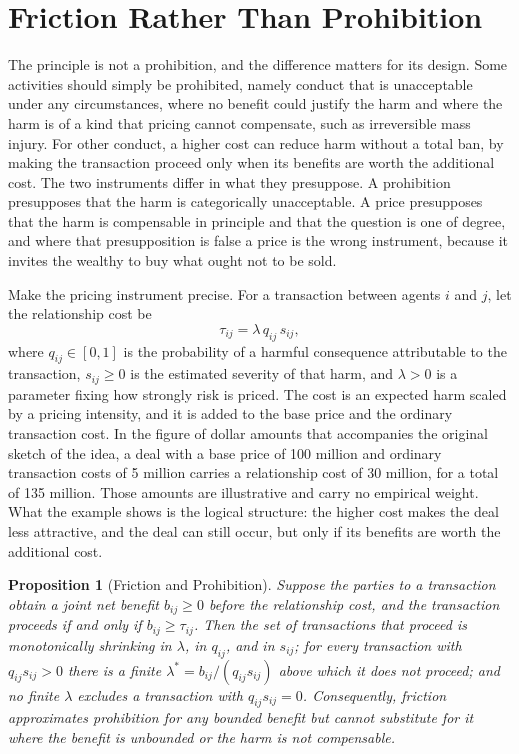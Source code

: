 \documentclass[11pt]{report}
\newtheorem{proposition}[theorem]{Proposition}
\theoremstyle{definition}
\theoremstyle{remark}
\begin{document}
\section{Friction Rather Than Prohibition}

The principle is not a prohibition, and the difference matters for its design. Some activities should simply be prohibited, namely conduct that is unacceptable under any circumstances, where no benefit could justify the harm and where the harm is of a kind that pricing cannot compensate, such as irreversible mass injury. For other conduct, a higher cost can reduce harm without a total ban, by making the transaction proceed only when its benefits are worth the additional cost. The two instruments differ in what they presuppose. A prohibition presupposes that the harm is categorically unacceptable. A price presupposes that the harm is compensable in principle and that the question is one of degree, and where that presupposition is false a price is the wrong instrument, because it invites the wealthy to buy what ought not to be sold.

Make the pricing instrument precise. For a transaction between agents $i$ and $j$, let the relationship cost be
\[
\tau_{ij}=\lambda\,q_{ij}\,s_{ij},
\]
where $q_{ij}\in[0,1]$ is the probability of a harmful consequence attributable to the transaction, $s_{ij}\ge0$ is the estimated severity of that harm, and $\lambda>0$ is a parameter fixing how strongly risk is priced. The cost is an expected harm scaled by a pricing intensity, and it is added to the base price and the ordinary transaction cost. In the figure of dollar amounts that accompanies the original sketch of the idea, a deal with a base price of 100 million and ordinary transaction costs of 5 million carries a relationship cost of 30 million, for a total of 135 million. Those amounts are illustrative and carry no empirical weight. What the example shows is the logical structure: the higher cost makes the deal less attractive, and the deal can still occur, but only if its benefits are worth the additional cost.

\begin{proposition}[Friction and Prohibition]\label{prop:friction}
Suppose the parties to a transaction obtain a joint net benefit $b_{ij}\ge0$ before the relationship cost, and the transaction proceeds if and only if $b_{ij}\ge\tau_{ij}$. Then the set of transactions that proceed is monotonically shrinking in $\lambda$, in $q_{ij}$, and in $s_{ij}$; for every transaction with $q_{ij}s_{ij}>0$ there is a finite $\lambda^\ast=b_{ij}/(q_{ij}s_{ij})$ above which it does not proceed; and no finite $\lambda$ excludes a transaction with $q_{ij}s_{ij}=0$. Consequently, friction approximates prohibition for any bounded benefit but cannot substitute for it where the benefit is unbounded or the harm is not compensable.
\end{proposition}
\end{document}
